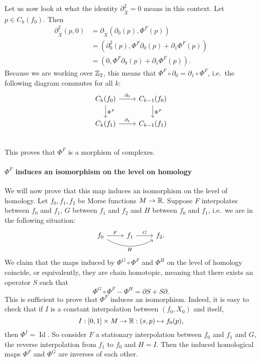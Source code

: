 \begin{myproof}
Let us now look at what the identity $\partial_{\tilde{X}}^2 = 0$ means in this context. Let $p \in C_k(f_0)$.
Then
\begin{align*}
    \partial_{\tilde{X}}^2 (p, 0) &= \partial_{\tilde{X}}(\partial_{0}(p),  \Phi^{F}(p))\\
                                                      &= (\partial_0^2(p), \Phi^{F}\partial_0(p)+ \partial_1 \Phi^{F}(p))\\
                                                    &= (0, \Phi^{F}\partial_0(p)+ \partial_1 \Phi^{F}(p))
.\end{align*} 
Because we are working over $\mathbb{Z}_2$, this means that $\Phi^{F}  \circ  \partial_0 = \partial_1  \circ  \Phi^{F}$, i.e.\ the following diagram commutes for all $k$:
\[
    \begin{tikzcd}
        C_k(f_0) \arrow[d, "\Phi^{F}"]\arrow[r, "\partial_0"] &C_{k-1}(f_0) \arrow[d, "\Phi^{F}"]\\
        C_k(f_1) \arrow[r, "\partial_1"] &C_{k-1}(f_1)\\
    \end{tikzcd}
\]
This proves that $\Phi^{F}$ is a morphism of complexes.

\paragraph{$\Phi^{F}$ induces an isomorphism on the level on homology}

We will now prove that this map induces an isomorphism on the level of homology.
Let $f_0, f_1, f_2$ be Morse functions $M \to  \mathbb{R}$.
Suppose $F$ interpolates between $f_0$ and $f_1$,
$G$ between $f_1$ and $f_2$ and $H$ between $f_0$ and $f_1$, i.e.\ we are in the following situation:
\[
    \begin{tikzcd}
        f_0 \arrow[rr, "H"', bend right] \arrow[r, "F"] &f_1 \arrow[r, "G"] &f_2.
    \end{tikzcd}
\]
We claim that the maps induced by $\Phi^{G} \circ \Phi^{F}$ and $\Phi^{H}$ on the level of homology coincide, or equivalently, they are chain homotopic, meaning that there exists an operator $S$ such that
 \[
\Phi^{G}  \circ  \Phi^{F} - \Phi^{H} = \partial S + S \partial
.\] 
This is sufficient to prove that $\Phi^{F}$ induces an isomorphism.
Indeed, it is easy to check that if $I$ is a constant interpolation between  $(f_0, X_0)$ and itself, 
\[
    I: [0,1] \times M \to  \mathbb{R}: (s, p) \mapsto f_0(p),
\] 
then $\Phi^{I} = \operatorname{Id}$.
So consider $F$ a stationary interpolation between $f_0$ and $f_1$ and $G$, the reverse interpolation from $f_1$ to $f_0$ and $H = I$. Then the induced homological maps $\Phi^{F}$ and $\Phi^{G}$ are inverses of each other.


\end{myproof}
